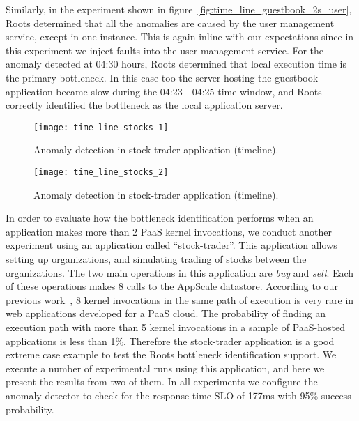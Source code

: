 Similarly, in the experiment shown in figure~\ref{fig:time_line_guestbook_2s_user}, Roots determined
that all the anomalies are caused by the user management service, except in one instance. This is again
inline with our expectations since in this experiment we inject faults into the user management service. For the
anomaly detected at 04:30 hours, Roots determined that local execution time is the primary bottleneck.
In this case too the server hosting the guestbook application became slow
during the 04:23 - 04:25 time window, and Roots correctly identified the bottleneck as the local
application server.

\begin{figure}
\centering
\texttt{[image: time\_line\_stocks\_1]}
\caption{Anomaly detection in stock-trader application (timeline).}
\label{fig:time_line_stocks_1}
\end{figure}

\begin{figure}
\centering
\texttt{[image: time\_line\_stocks\_2]}
\caption{Anomaly detection in stock-trader application (timeline).}
\label{fig:time_line_stocks_2}
\end{figure}

In order to evaluate how the bottleneck identification performs when an application makes more than 2
PaaS kernel invocations, we conduct another experiment using an application
called ``stock-trader''.
This application allows setting up organizations, and simulating trading of stocks between the
organizations. The two main operations in this application are \textit{buy} and \textit{sell}. Each of
these operations makes 8 calls to the AppScale datastore. 
According to our previous work~\cite{Jayathilaka:2015:RTS:2806777.2806842}, 8 kernel invocations in the
same path of execution is very rare in web applications developed for a PaaS cloud. The probability
of finding an execution path with more than 5 kernel invocations in a sample of PaaS-hosted
applications is less than 1\%. Therefore the stock-trader application is a good extreme case
example to test the Roots bottleneck identification support.
We execute a number of experimental runs using this application,
and here we present the results from two of them. In all experiments we configure the anomaly
detector to check for the response time SLO of 177ms with 95\% success probability.

